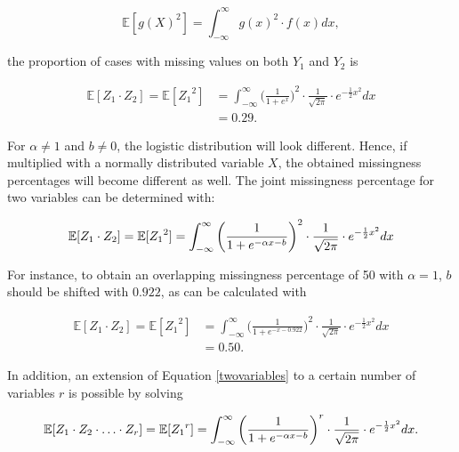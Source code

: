 \documentclass[11pt,a4paper]{article}
\begin{document}
\begin{equation*}
\mathbb{E}[{g(X)}^2] = \int_{-\infty}^\infty {g(x)}^2 \cdot f(x) dx, 
\end{equation*}

\noindent the proportion of cases with missing values on both $Y_1$ and $Y_2$ is

\begin{align}
\mathbb{E}[Z_1 \cdot Z_2] = \mathbb{E}[{Z_1}^2] & = \int_{-\infty}^\infty {\bigg(\frac{1}{1 + e^x}\bigg)}^2 \cdot \frac{1}{\sqrt{2\pi}}\cdot e^{-\frac{1}{2}x^2} dx \nonumber \\
& = 0.29. \label{29}
\end{align}

\noindent For $\alpha \neq 1$ and $b \neq 0$, the logistic distribution will look different. Hence, if multiplied with a normally distributed variable $X$, the obtained missingness percentages will become different as well. The joint missingness percentage for two variables can be determined with: 

\begin{equation} \label{twovariables}
\mathbb{E}[Z_1 \cdot Z_2] = \mathbb{E}[{Z_1}^2] = \int_{-\infty}^\infty {\bigg(\frac{1}{1 + e^{-\alpha x - b}}\bigg)}^2 \cdot \frac{1}{\sqrt{2\pi}}\cdot e^{-\frac{1}{2}x^2} dx\\
\end{equation}

\noindent For instance, to obtain an overlapping missingness percentage of 50 with $\alpha = 1$, $b$ should be shifted with $0.922$, as can be calculated with 

\begin{align*}
\mathbb{E}[Z_1 \cdot Z_2] = \mathbb{E}[{Z_1}^2] &= \int_{-\infty}^\infty {\bigg(\frac{1}{1 + e^{-x - 0.922}}\bigg)}^2 \cdot \frac{1}{\sqrt{2\pi}}\cdot e^{-\frac{1}{2}x^2} dx\\
&= 0.50.
\end{align*}

\noindent In addition, an extension of Equation \eqref{twovariables} to a certain number of variables $r$ is possible by solving 

\begin{equation*}
\mathbb{E}[Z_1 \cdot Z_2 \cdot \hdots \cdot Z_r] = \mathbb{E}[{Z_1}^r] = \int_{-\infty}^\infty {\bigg(\frac{1}{1 + e^{-\alpha x - b}}\bigg)}^r \cdot \frac{1}{\sqrt{2\pi}}\cdot e^{-\frac{1}{2}x^2} dx.\\
\end{equation*}
\end{document}
